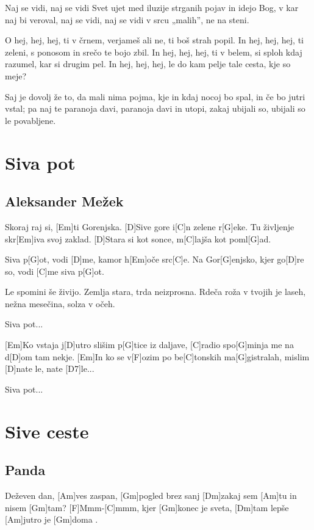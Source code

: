 \documentclass[a4paper,12pt]{article}
\begin{document}
\begin{multicols}{2}
\begin{guitar}
Naj se vidi,
naj se vidi Svet ujet
med iluzije strganih pojav
in idejo Bog, v kar naj bi veroval,
naj se vidi,
naj se vidi v srcu „malih”,
ne na steni.


O hej, hej, hej, ti v črnem,
verjameš ali ne, ti boš strah popil.
In hej, hej, hej, ti zeleni,
s ponosom in srečo te bojo zbil.
In hej, hej, hej, ti v belem,
si sploh kdaj razumel, kar si drugim pel.
In hej, hej, hej, le do kam pelje tale cesta,
kje so meje?


Saj je dovolj že to, da mali nima pojma,
kje in kdaj nocoj bo spal,
in če bo jutri vstal; pa naj te paranoja davi,
paranoja davi in utopi,
zakaj ubijali so,
ubijali so le povabljene.

\end{guitar}
\section{Siva pot}
\subsection*{Aleksander Mežek}
\begin{guitar}
[G]Skoraj raj si, [Em]ti Gorenjska. 
[D]Sive gore i[C]n zelene r[G]eke. 
Tu življenje skr[Em]iva svoj zaklad. 
[D]Stara si kot sonce, m[C]lajša kot poml[G]ad. 


Siva p[G]ot, vodi [D]me, 
kamor h[Em]oče src[C]e. 
Na Gor[G]enjsko, kjer go[D]re so, 
vodi [C]me siva p[G]ot. 


Le spomini še živijo. 
Zemlja stara, trda neizprosna. 
Rdeča roža v tvojih je laseh, 
nežna mesečina, solza v očeh. 


Siva pot... 


[Em]Ko vstaja j[D]utro slišim p[G]tice iz daljave, 
[C]radio spo[G]minja me na d[D]om tam nekje. 
[Em]In ko se v[F]ozim po be[C]tonskih ma[G]gistralah,
mislim [D]nate le, nate [D7]le... 


Siva pot... 

\end{guitar}
\section{Sive ceste}
\subsection*{Panda}
\begin{guitar}
[Dm]Deževen dan, [Am]ves zaspan, [Gm]pogled brez sanj 
[Dm]zakaj sem [Am]tu in nisem [Gm]tam? 
[F]Mmm-[C]mmm, kjer [Gm]konec je sveta, 
[Dm]tam lepše [Am]jutro je [Gm]doma .


\end{guitar}
\end{multicols}
\end{document}
